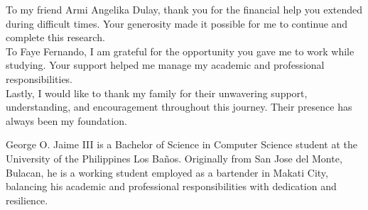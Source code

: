\documentclass[journal]{./IEEE/IEEEtran}
\begin{document}
To my friend Armi Angelika Dulay, thank you for the financial help you extended during difficult times. Your generosity made it possible for me to continue and complete this research. \hfill \\

To Faye Fernando, I am grateful for the opportunity you gave me to work while studying. Your support helped me manage my academic and professional responsibilities. \hfill \\

Lastly, I would like to thank my family for their unwavering support, understanding, and encouragement throughout this journey. Their presence has always been my foundation.

\begin{biography}{George O. Jaime III}
is a Bachelor of Science in Computer Science student at the University of the Philippines Los Baños. Originally from San Jose del Monte, Bulacan, he is a working student employed as a bartender in Makati City, balancing his academic and professional responsibilities with dedication and resilience.
\end{biography}
\end{document}
